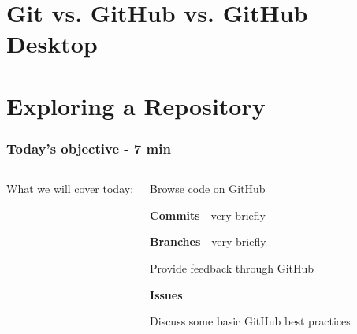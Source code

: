 \documentclass[aspectratio=169]{beamer} %
\begin{document}
\begin{frame}
\begin{columns}[c]
	\end{columns}
\end{frame}

\section{Git vs. GitHub vs. GitHub Desktop}






\section{Exploring a Repository}

\begin{frame}
	\frametitle{Today's objective - 7 min}
	
	\begin{columns}[c] 
		
		
		
		\Large{What we will cover today:}
		
		\vspace{.5cm}
		
		\begin{itemize}
			\large{\item Browse code on GitHub}
			\begin{itemize}
				\normalsize{\item \textbf{Commits} - very briefly}
				\normalsize{\item \textbf{Branches} - very briefly}			
			\end{itemize}
			\large{\item Provide feedback through GitHub}
			\begin{itemize}
				\normalsize{\item \textbf{Issues}}		
			\end{itemize}		
			\large{\item Discuss some basic GitHub best practices}
		\end{itemize}
		
		
	\end{columns}
\end{frame}
\end{document}
